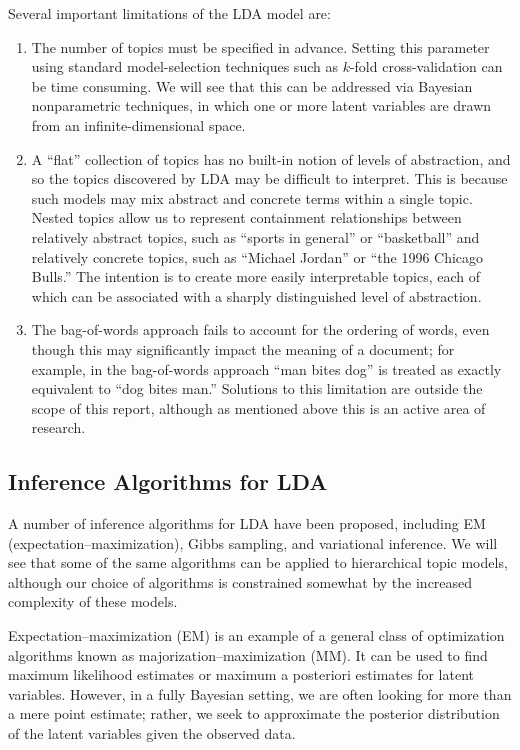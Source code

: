 \documentclass{article}
\begin{document}
Several important limitations of the LDA model are:
\begin{enumerate}
\item The number of topics must be specified in advance.
Setting this parameter using standard model-selection techniques such as $k$-fold cross-validation can be time consuming.
We will see that this can be addressed via Bayesian nonparametric techniques, in which one or more latent variables are drawn from an infinite-dimensional space.
\item A ``flat'' collection of topics has no built-in notion of levels of abstraction, and so the topics discovered by LDA may be difficult to interpret.
This is because such models may mix abstract and concrete terms within a single topic.
Nested topics allow us to represent containment relationships between relatively abstract topics, such as ``sports in general'' or ``basketball'' and relatively concrete topics, such as ``Michael Jordan'' or ``the 1996 Chicago Bulls.''
The intention is to create more easily interpretable topics, each of which can be associated with a sharply distinguished level of abstraction.
\item The bag-of-words approach fails to account for the ordering of words, even though this may significantly impact the meaning of a document; for example, in the bag-of-words approach ``man bites dog'' is treated as exactly equivalent to ``dog bites man.''
Solutions to this limitation are outside the scope of this report, although as mentioned above this is an active area of research.
\end{enumerate}

\subsection{Inference Algorithms for LDA}

A number of inference algorithms for LDA have been proposed, including EM (expectation--maximization), Gibbs sampling, and variational inference.
We will see that some of the same algorithms can be applied to hierarchical topic models, although our choice of algorithms is constrained somewhat by the increased complexity of these models.

Expectation--maximization (EM) is an example of a general class of optimization algorithms known as majorization--maximization (MM).
It can be used to find maximum likelihood estimates or maximum a posteriori estimates for latent variables.
However, in a fully Bayesian setting, we are often looking for more than a mere point estimate; rather, we seek to approximate the posterior distribution of the latent variables given the observed data.
\end{document}
